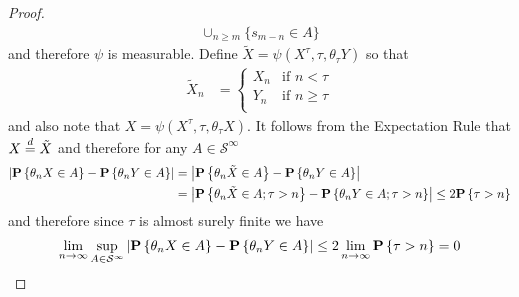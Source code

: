 \begin{proof}
\begin{align*}
\cup_{n \geq m} \lbrace s_{m-n} \in A \rbrace
\end{align*}
and therefore $\psi$ is measurable.  Define $\tilde{X} = \psi(X^\tau,
\tau, \theta_\tau Y)$ so that
\begin{align*}
\tilde{X}_n &= \begin{cases}
X_n & \text{if $n < \tau$} \\
Y_n & \text{if $n \geq \tau$} \\
\end{cases}
\end{align*}
and also note that $X = \psi(X^\tau, \tau, \theta_\tau X)$.  It
follows from the Expectation Rule that $X \overset{d}= \tilde{X}$ and
therefore for any $A \in \mathcal{S}^{\infty}$
\begin{align*}
\left \vert \textbf{P}\left \{\theta_n X \in A \right \} - \textbf{P}\left \{\theta_n Y \in A \right \}  \right \vert 
&=\left \vert \textbf{P}\left \{\theta_n \tilde{X} \in A \right \} - \textbf{P}\left \{\theta_n Y \in A \right \}  \right \vert \\
&=\left \vert \textbf{P}\left \{\theta_n \tilde{X} \in A; \tau > n \right \} -
  \textbf{P}\left \{\theta_n Y \in A; \tau > n \right \}  \right \vert 
\leq 2 \textbf{P}\left \{\tau > n \right \}
\end{align*}
and therefore since $\tau$ is almost surely finite we have
\begin{align*}
\lim_{n \to \infty} \sup_{A \in \mathcal{S}^{\infty}}
  \left \vert \textbf{P}\left \{\theta_n X \in A \right \} - \textbf{P}\left \{\theta_n Y \in A \right \}
   \right \vert \leq 2 \lim_{n \to \infty} \textbf{P}\left \{\tau > n \right \} = 0
\end{align*}
\end{proof}

